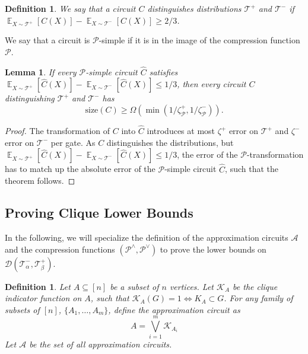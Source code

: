 \documentclass[10pt,a4paper]{article}
\DeclareMathOperator{\E}{\mathbb{E}}
\newtheorem{definition}[theorem]{Definition}
\newtheorem{lemma}[theorem]{Lemma}
\newcommand{\size}{\mathrm{size}}
\newcommand{\jnote}[1]{\todo[inline,backgroundcolor=blue!20!green]{#1 \\ \textsc{--Jarek}}}
\begin{document}

\begin{definition}
    We say that a circuit $C$ distinguishes distributions $\mathcal{T}^+$ and $\mathcal{T}^-$ if $\E_{X \sim \mathcal{T}^+} [C(X)] - \E_{X\sim \mathcal{T}^{-}} [C(X)] \geq 2/3$.
\end{definition} 
We say that a circuit is $\mathcal{P}$-simple if it is in the image of the compression function $\mathcal{P}$. 
\begin{lemma}
\label{lem:extended-approximation}
    If every $\mathcal{P}$-simple circuit $\hat{C}$ satisfies $\E_{X \sim \mathcal{T}^+} [\hat{C}(X)] - \E_{X\sim \mathcal{T}^{-}} [\hat{C}(X)] \leq 1/3$, then every circuit $C$ distinguishing $\mathcal{T}^+$ and $\mathcal{T}^-$ has 
    \begin{equation*}
        \size(C) \geq \Omega(\min(1/\zeta^+_{\mathcal{P}}, 1/\zeta^-_{\mathcal{P}})).
    \end{equation*}
\end{lemma}
\begin{proof}
    The transformation of $C$ into $\hat{C}$ introduces at most $\zeta^+$ error on $\mathcal{T}^+$ and $\zeta^-$ error on $\mathcal{T}^-$ per gate. As $C$ distinguishes the distributions, but $\E_{X \sim \mathcal{T}^+} [\hat{C}(X)] - \E_{X\sim \mathcal{T}^{-}} [\hat{C}(X)] \leq 1/3$, the error of the $\mathcal{P}$-transformation has to match up the absolute error of the $\mathcal{P}$-simple circuit $\hat{C}$, such that the theorem follows.
\end{proof}


\subsection{Proving Clique Lower Bounds}

In the following, we will specialize the definition of the approximation circuits $\mathcal{A}$ and the compression functions $(\mathcal{P}^\wedge, \mathcal{P}^\vee)$ to prove the lower bounds on $\mathcal{D}(\mathcal{T}^-_\alpha, \mathcal{T}^+_\beta)$.

\begin{definition}
    Let $A \subseteq [n]$ be a subset of $n$ vertices. Let $\mathcal{K}_A$ be the clique indicator function on $A$, such that $\mathcal{K}_A(G)=1 \Leftrightarrow K_A \subset G$. For any family of subsets of $[n]$, $\{A_1, \ldots, A_m\}$, define the approximation circuit as 
    \begin{equation*}
        A = \bigvee_{i=1}^{m} \mathcal{K}_{A_i}
    \end{equation*}
    Let $\mathcal{A}$ be the set of all approximation circuits.
\end{definition}
\end{document}
